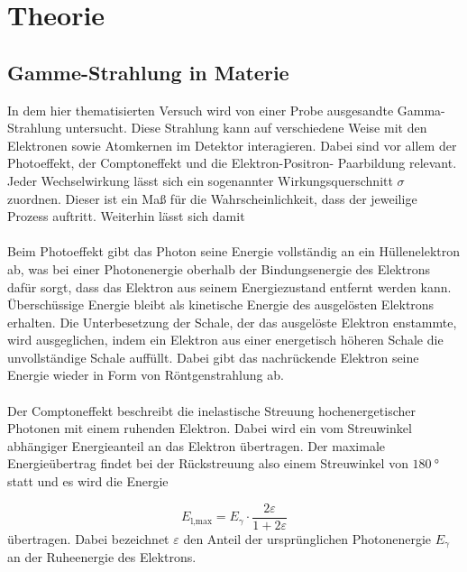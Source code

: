 \section{Theorie}
\label{sec:Theorie}


\subsection{Gamme-Strahlung in Materie}
\label{subsec:t1}

In dem hier thematisierten Versuch wird von einer Probe ausgesandte Gamma-Strahlung untersucht.
Diese Strahlung kann auf verschiedene Weise mit den Elektronen sowie Atomkernen im Detektor
interagieren.
Dabei sind vor allem der Photoeffekt, der Comptoneffekt und die Elektron-Positron-
Paarbildung relevant.
Jeder Wechselwirkung lässt sich ein sogenannter Wirkungsquerschnitt
$\sigma$ zuordnen. Dieser ist ein Maß für die Wahrscheinlichkeit,
dass der jeweilige Prozess auftritt. Weiterhin lässt sich damit \\ \\
Beim Photoeffekt gibt das Photon seine Energie vollständig an ein Hüllenelektron ab, was bei
einer Photonenergie oberhalb der Bindungsenergie des Elektrons dafür sorgt, dass das Elektron
aus seinem Energiezustand entfernt werden kann. Überschüssige Energie bleibt als kinetische
Energie des ausgelösten Elektrons erhalten. Die Unterbesetzung der Schale, der das ausgelöste
Elektron enstammte, wird ausgeglichen, indem ein Elektron aus einer energetisch höheren Schale
die unvollständige Schale auffüllt. Dabei gibt das nachrückende Elektron seine Energie wieder
in Form von Röntgenstrahlung ab. \\ \\
Der Comptoneffekt beschreibt die inelastische Streuung hochenergetischer Photonen mit einem
ruhenden Elektron.
Dabei wird ein vom Streuwinkel abhängiger Energieanteil an das Elektron übertragen.
Der maximale Energieübertrag findet bei der Rückstreuung also einem Streuwinkel
von $\SI{180}{\degree}$ statt und es wird die Energie

\begin{equation}
  \label{eqn:e1t1}
  E_\text{l,max} = E_{\gamma} \cdot \frac{2\varepsilon}{1 + 2\varepsilon}
\end{equation}
übertragen. Dabei bezeichnet $\varepsilon$ den Anteil der ursprünglichen
Photonenergie $E_{\gamma}$ an der Ruheenergie des Elektrons.

